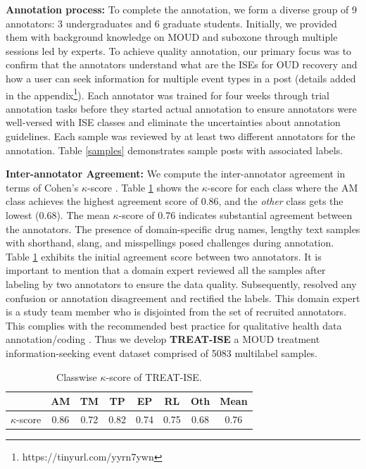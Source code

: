 \documentclass[letterpaper]{article}
\begin{document}
\noindent
\textbf{Annotation process:} To complete the annotation, we form a diverse group of 9 annotators: 3 undergraduates and 6 graduate students. Initially, we provided them with background knowledge on MOUD and suboxone through multiple sessions led by experts. %
To achieve quality annotation, our primary focus was to confirm that the annotators understand what are the ISEs for OUD recovery and how a user can seek information for multiple event types in a post (details added in the appendix\footnote{https://tinyurl.com/yyrn7ywn}). Each annotator was trained for four weeks through trial annotation tasks before they started actual annotation to ensure annotators were well-versed with ISE classes and eliminate the uncertainties about annotation guidelines.  Each sample was reviewed by at least two different annotators for the annotation. Table \ref{samples} demonstrates sample posts with associated labels.

\noindent
\textbf{Inter-annotator Agreement:} We compute the inter-annotator agreement in terms of Cohen's $\kappa$-score \cite{cohen1960coefficient}. Table \ref{kappa-score} shows the $\kappa$-score for each class where the AM class achieves the highest agreement score of 0.86, and the \textit{other} class gets the lowest (0.68). The mean $\kappa$-score of 0.76 indicates substantial agreement between the annotators. The presence of domain-specific drug names, lengthy text samples with shorthand, slang, and misspellings posed challenges during annotation. Table \ref{kappa-score} exhibits the initial agreement score between two annotators.
It is important to mention that a domain expert reviewed all the samples after labeling by two annotators to ensure the data quality. Subsequently, resolved any confusion or annotation disagreement and rectified the labels. This domain expert is a study team member who is disjointed from the set of recruited annotators. This complies with the recommended best practice for qualitative health data annotation/coding \cite{busetto2020use}. Thus we develop \textbf{TREAT-ISE} a MOUD treatment information-seeking event dataset comprised of 5083 multilabel samples.
\begin{table}[h!]
\centering
\footnotesize
\begin{tabular}{l|cccccc|c}
&\textbf{AM}&\textbf{TM}&\textbf{TP}&\textbf{EP} & \textbf{RL} & \textbf{Oth}&\textbf{Mean}\\
\midrule
$\kappa$-score  & 0.86 &0.72 & 0.82 & 0.74 & 0.75 &0.68 & 0.76 \\
\hline

\end{tabular}
\caption{Classwise $\kappa$-score of TREAT-ISE.}
\label{kappa-score}
\end{table}
\end{document}
